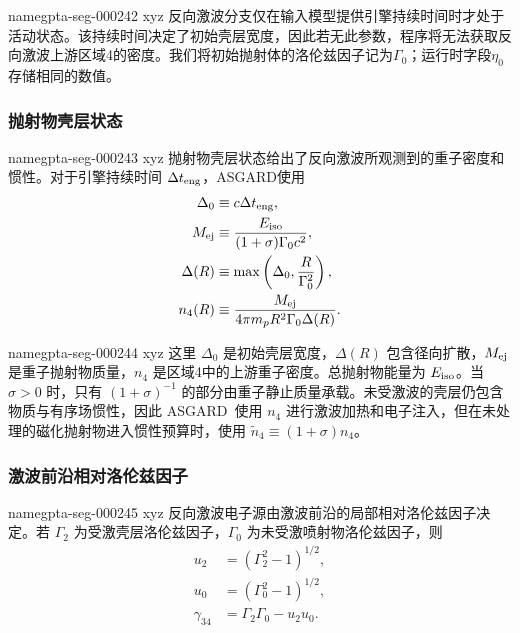 \documentclass[twocolumn]{aastex702}
\makeatletter
\newcommand{\asgard}{\textsc{ASGARD}}
\providecommand{\gptareaderanchor}[1]{\pdfdest name{#1} xyz}%
\providecommand{\gptareaderanchor}[1]{\special{pdf:dest (#1) [ @thispage /XYZ @xpos @ypos null ]}}%
\makeatother
\begin{document}
\gptareaderanchor{gpta-seg-000242}%
反向激波分支仅在输入模型提供引擎持续时间时才处于活动状态。该持续时间决定了初始壳层宽度，因此若无此参数，程序将无法获取反向激波上游区域4的密度。我们将初始抛射体的洛伦兹因子记为\(\Gamma_0\)；运行时字段\(\eta_0\)存储相同的数值。

\subsubsection{抛射物壳层状态}


\gptareaderanchor{gpta-seg-000243}%
抛射物壳层状态给出了反向激波所观测到的重子密度和惯性。对于引擎持续时间 \(\Delta t_{\rm eng}\)，\asgard 使用
\begin{equation}
\begin{aligned}
\Delta_0&\equiv c\Delta t_{\rm eng},\\
M_{\rm ej}&\equiv \frac{E_{\rm iso}}{(1+\sigma)\Gamma_0c^2},\\
\Delta(R)&\equiv \max\left(\Delta_0,\frac{R}{\Gamma_0^2}\right),\\
n_4(R)&\equiv \frac{M_{\rm ej}}
{4\pi m_pR^2\Gamma_0\Delta(R)} .
\end{aligned}
\end{equation}

\gptareaderanchor{gpta-seg-000244}%
这里 \(\Delta_0\) 是初始壳层宽度，\(\Delta(R)\) 包含径向扩散，\(M_{\rm ej}\) 是重子抛射物质量，\(n_4\) 是区域4中的上游重子密度。总抛射物能量为 \(E_{\rm iso}\)。当 \(\sigma>0\) 时，只有 \((1+\sigma)^{-1}\) 的部分由重子静止质量承载。未受激波的壳层仍包含物质与有序场惯性，因此 \asgard\ 使用 \(n_4\) 进行激波加热和电子注入，但在未处理的磁化抛射物进入惯性预算时，使用 \(\tilde n_4\equiv(1+\sigma)n_4\)。

\subsubsection{激波前沿相对洛伦兹因子}


\gptareaderanchor{gpta-seg-000245}%
反向激波电子源由激波前沿的局部相对洛伦兹因子决定。若 \(\Gamma_2\) 为受激壳层洛伦兹因子，\(\Gamma_0\) 为未受激喷射物洛伦兹因子，则
\begin{equation}
\begin{aligned}
u_2&=(\Gamma_2^2-1)^{1/2},\\
u_0&=(\Gamma_0^2-1)^{1/2},\\
\gamma_{34}&=\Gamma_2\Gamma_0-u_2u_0.
\end{aligned}
\end{equation}
\end{document}
